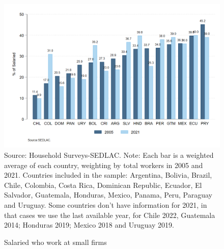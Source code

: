 \documentclass[english]{article}
\begin{document}
\begin{itemize}
\begin{figure}[!htb]
    \justifying
     \caption{Salaried who work at small firms}     
     \includegraphics[scale=.3]{latex/figures/Snapshot/snapshot_dependents_small.png}
    \label{fig:SalariedSmall}
    \footnotesize{Source: Household Surveys-SEDLAC.}
    \footnotesize{Note: Each bar is a weighted average of each country, weighting by total workers in 2005 and 2021. Countries included in the sample: Argentina, Bolivia, Brazil, Chile, Colombia, Costa Rica, Dominican Republic, Ecuador, El Salvador, Guatemala, Honduras, Mexico, Panama, Peru, Paraguay and Uruguay. Some countries don’t have information for 2021, in that cases we use the last available year, for Chile 2022, Guatemala 2014; Honduras 2019; Mexico 2018 and Uruguay 2019.}
\end{figure}



\end{itemize}
\end{document}
